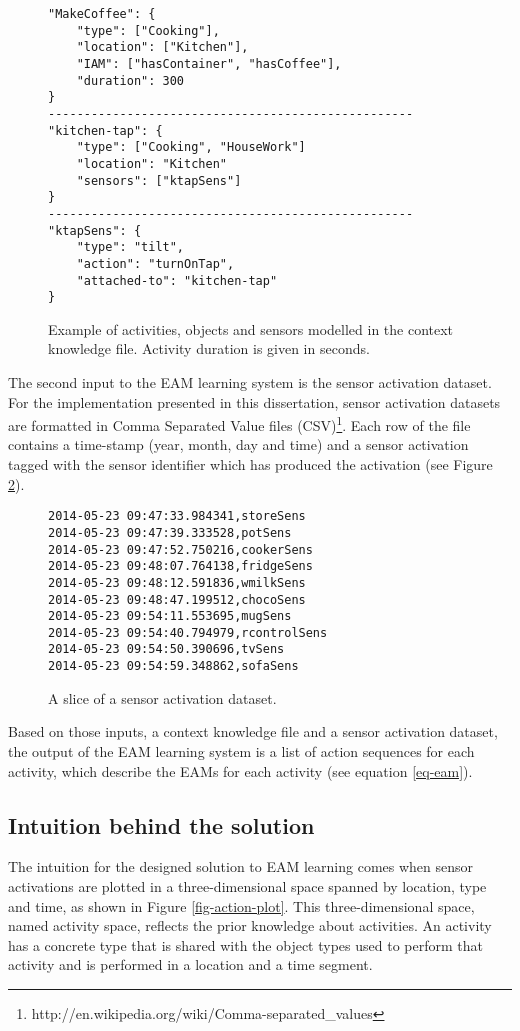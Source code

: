 \begin{figure}[htbp]
\begin{small}
\begin{lstlisting}
"MakeCoffee": {
	"type": ["Cooking"],
	"location": ["Kitchen"],
	"IAM": ["hasContainer", "hasCoffee"],
	"duration": 300
}
---------------------------------------------------
"kitchen-tap": {
	"type": ["Cooking", "HouseWork"]
	"location": "Kitchen"
	"sensors": ["ktapSens"]
}
---------------------------------------------------
"ktapSens": {
	"type": "tilt",
	"action": "turnOnTap",
	"attached-to": "kitchen-tap"
}
\end{lstlisting}
\end{small}
\caption{Example of activities, objects and sensors modelled in the context knowledge file. Activity duration is given in seconds.}
\label{fig-context-json}
\end{figure}

The second input to the EAM learning system is the sensor activation dataset. For the implementation presented in this dissertation, sensor activation datasets are formatted in Comma Separated Value files (CSV)\footnote{http://en.wikipedia.org/wiki/Comma-separated\_values}. Each row of the file contains a time-stamp (year, month, day and time) and a sensor activation tagged with the sensor identifier which has produced the activation (see Figure \ref{fig-dataset}).


\begin{figure}[htbp]
\begin{small}
\begin{lstlisting}
2014-05-23 09:47:33.984341,storeSens
2014-05-23 09:47:39.333528,potSens
2014-05-23 09:47:52.750216,cookerSens
2014-05-23 09:48:07.764138,fridgeSens
2014-05-23 09:48:12.591836,wmilkSens
2014-05-23 09:48:47.199512,chocoSens
2014-05-23 09:54:11.553695,mugSens
2014-05-23 09:54:40.794979,rcontrolSens
2014-05-23 09:54:50.390696,tvSens
2014-05-23 09:54:59.348862,sofaSens
\end{lstlisting}
\end{small}
\caption{A slice of a sensor activation dataset.}
\label{fig-dataset}
\end{figure}

Based on those inputs, a context knowledge file and a sensor activation dataset, the output of the EAM learning system is a list of action sequences for each activity, which describe the EAMs for each activity (see equation \ref{eq-eam}). 

\subsection{Intuition behind the solution}
\label{subsec:approach:intuition}
The intuition for the designed solution to EAM learning comes when sensor activations are plotted in a three-dimensional space spanned by location, type and time, as shown in Figure \ref{fig-action-plot}. This three-dimensional space, named activity space, reflects the prior knowledge about activities. An activity has a concrete type that is shared with the object types used to perform that activity and is performed in a location and a time segment. 

